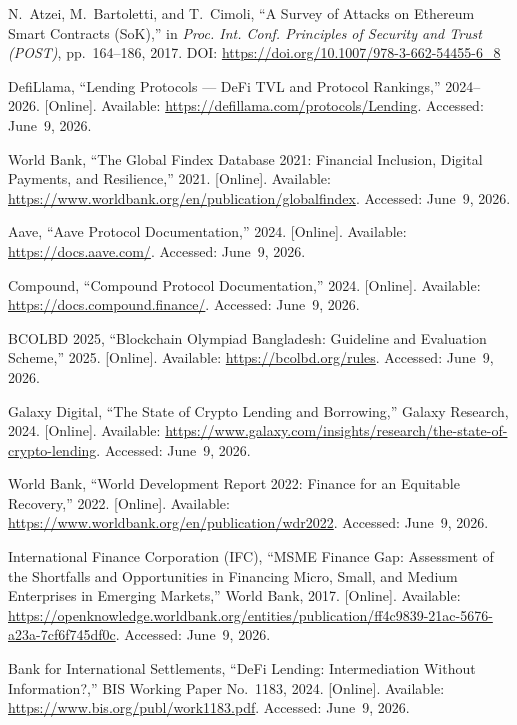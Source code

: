 \documentclass[12pt, a4paper]{report}
\begin{document}
{\begin{enumerate}[label={[\arabic*]}]
\item N.~Atzei, M.~Bartoletti, and T.~Cimoli, ``A Survey of Attacks on Ethereum Smart Contracts (SoK),'' in \textit{Proc. Int. Conf. Principles of Security and Trust (POST)}, pp.~164--186, 2017. DOI: \url{https://doi.org/10.1007/978-3-662-54455-6_8}

\item DefiLlama, ``Lending Protocols --- DeFi TVL and Protocol Rankings,'' 2024--2026. [Online]. Available: \url{https://defillama.com/protocols/Lending}. Accessed: June~9, 2026.

\item World Bank, ``The Global Findex Database 2021: Financial Inclusion, Digital Payments, and Resilience,'' 2021. [Online]. Available: \url{https://www.worldbank.org/en/publication/globalfindex}. Accessed: June~9, 2026.

\item Aave, ``Aave Protocol Documentation,'' 2024. [Online]. Available: \url{https://docs.aave.com/}. Accessed: June~9, 2026.

\item Compound, ``Compound Protocol Documentation,'' 2024. [Online]. Available: \url{https://docs.compound.finance/}. Accessed: June~9, 2026.

\item BCOLBD 2025, ``Blockchain Olympiad Bangladesh: Guideline and Evaluation Scheme,'' 2025. [Online]. Available: \url{https://bcolbd.org/rules}. Accessed: June~9, 2026.

\item Galaxy Digital, ``The State of Crypto Lending and Borrowing,'' Galaxy Research, 2024. [Online]. Available: \url{https://www.galaxy.com/insights/research/the-state-of-crypto-lending}. Accessed: June~9, 2026.

\item World Bank, ``World Development Report 2022: Finance for an Equitable Recovery,'' 2022. [Online]. Available: \url{https://www.worldbank.org/en/publication/wdr2022}. Accessed: June~9, 2026.

\item International Finance Corporation (IFC), ``MSME Finance Gap: Assessment of the Shortfalls and Opportunities in Financing Micro, Small, and Medium Enterprises in Emerging Markets,'' World Bank, 2017. [Online]. Available: \url{https://openknowledge.worldbank.org/entities/publication/ff4c9839-21ac-5676-a23a-7cf6f745df0c}. Accessed: June~9, 2026.

\item Bank for International Settlements, ``DeFi Lending: Intermediation Without Information?,'' BIS Working Paper No.~1183, 2024. [Online]. Available: \url{https://www.bis.org/publ/work1183.pdf}. Accessed: June~9, 2026.


\end{enumerate}}
\end{document}
